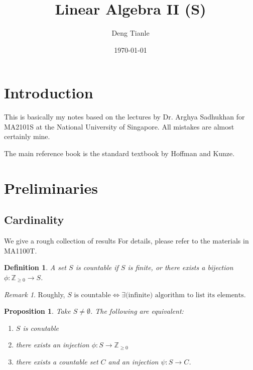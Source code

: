 \documentclass{scrartcl}
\def\ge{\geqslant}
\def\Z{\mathbb{Z}}
\begin{document}
\newtheorem{theorem}{Theorem}[subsection]
\newtheorem{lemma}[theorem]{Lemma}
\newtheorem{corollary}[theorem]{Corollary}
\newtheorem{proposition}[theorem]{Proposition}

\newtheorem{definition}{Definition}[subsection]

\theoremstyle{remark}
\newtheorem*{remark}{Remark}
\newtheorem*{example}{Example}
\newtheorem*{examples}{Examples}

\title{Linear Algebra II (S)}
\author{Deng Tianle}
\date{\today}
\maketitle

\tableofcontents

\section{Introduction}

This is basically my notes based on the lectures by Dr. Arghya Sadhukhan for MA2101S at the National University of Singapore. All mistakes are almost certainly mine. 
\par 
The main reference book is the standard textbook by Hoffman and Kunze. 

\section{Preliminaries}
\subsection{Cardinality}
We give a rough collection of results For details, please refer to the materials in MA1100T. 
\begin{definition}
A set $S$ is countable if $S$ is finite, or there exists a bijection $\phi: \Z_{\ge 0} \to S$. 
\end{definition}
\begin{remark}
Roughly, $S \text{ is countable} \iff \exists \text{(infinite) algorithm to list its elements}$. 
\end{remark}
\begin{proposition} \label{countability}
Take $S \ne \emptyset$. The following are equivalent: 
\begin{enumerate}
	\item $S$ is conutable
	\item there exists an injection $\phi: S \to \Z_{\ge 0}$
	\item there exists a countable set $C$ and an injection $\psi:S \to C$.
\end{enumerate}
\end{proposition}
\end{document}
